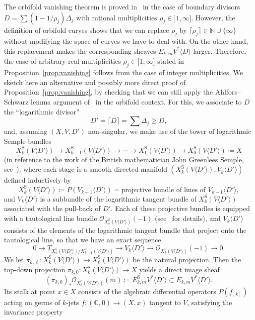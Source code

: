 \documentclass[AHL,Unicode,longabstracts,published]{cedram}
\newcommand*\rS{\mathrm{S}}
\newcommand*\cO{\mathcal{O}}
\newcommand*\bC{\mathbb{C}}
\newcommand*\bN{\mathbb{N}}
\let\geq\geqslant
\newcommand*\bydef{\coloneqq}
\begin{document}
The orbifold vanishing theorem is proved in~\cite{CDR20} in the case of boundary divisors $D=\sum(1-1/\rho_j)\Delta_j$ with rational multiplicities
$\rho_j\in{}]1,\infty]$. However, the definition of orbifold curves shows that we can replace $\rho_j$ by $\lceil\rho_j\rceil\in\bN\cup\{\infty\}$ without modifying the space of curves we have to deal with. On the other hand, this replacement makes the corresponding sheaves $E_{k,m}V^*\langle D\rangle$ larger. Therefore, the case of arbitrary real multiplicities $\rho_j\in{}]1,\infty]$ stated in Proposition~\ref{prop:vanishing} follows from the case of integer multiplicities. We sketch here an alternative and possibly more direct proof of Proposition~\ref{prop:vanishing}, by checking that we can still apply the Ahlfors--Schwarz lemma argument of~\cite{Dem97} in the orbifold context. For this, we associate to $D$ the ``logarithmic divisor''
\[
D'=\lceil D\rceil = \sum\Delta_j \geq D,
\]
and, assuming $(X,V,D')$ non-singular, we make use of the tower of logarithmic Semple bundles
\[
X^\rS_k(V\langle D'\rangle)\to X^\rS_{k-1}(V\langle D'\rangle)\to\cdots\to X^\rS_1(V\langle D'\rangle)\to X^\rS_0(V\langle D'\rangle)
\bydef X
\]
(in reference to the work of the British mathematician John Greenlees Semple, see~\cite{Sem54}), where each stage is a smooth directed manifold
$(X^\rS_k(V\langle D'\rangle),V_k\langle D'\rangle)$ defined inductively by
\[
X^\rS_k(V\langle D'\rangle)
\bydef P(V_{k-1}\langle D'\rangle)=
\text{projective bundle of lines of $V_{k-1}\langle D'\rangle$},
\]
and $V_k\langle D'\rangle$ is a subbundle of the logarithmic tangent bundle of $X^\rS_k(V\langle D'\rangle)$ associated with the pull-back of $D'$. Each of these projective bundles is equipped with a tautological line bundle
$\cO_{X^\rS_k(V\langle D'\rangle)}(-1)$ (see~\cite{Dem97} for details), and $V_k\langle D'\rangle$ consists of the elements of the logarithmic tangent bundle that project onto the tautological line, so that we have an exact sequence
\[
0\to T_{X^\rS_k(V\langle D'\rangle)/X^\rS_{k-1}(V\langle D'\rangle)}
\to V_k\langle D'\rangle\to \cO_{X^\rS_k(V\langle D'\rangle)}(-1)\to 0.
\]
We let
$\pi_{k,\ell}\colon X^\rS_k(V\langle D'\rangle)\to X^\rS_\ell(V\langle D'\rangle)$ be the natural projection. Then the top-down projection $\pi_{k,0}\colon X^\rS_k(V\langle D'\rangle)\to X$ yields a direct image sheaf
\[
(\pi_{k,0})_*\cO_{X^\rS_k(V\langle D'\rangle)}(m)
\bydef E^\rS_{k,m}V^*\langle D'\rangle
\subset E_{k,m}V^*\langle D'\rangle.
\]
Its stalk at point $x\in X$ consists of the algebraic differential operators $P(f_{[k]})$ acting on germs of $k$-jets $f\colon(\bC,0)\to(X,x)$ tangent to $V$, satisfying the invariance property
\end{document}
